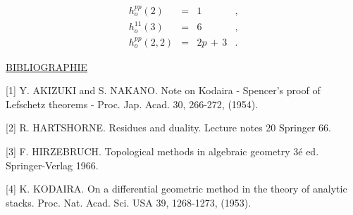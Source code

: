 \begin{equation*}
\begin{array}{rcll}
h_o^{pp}(2) & = & 1 & , \\[2ex]
h_o^{11}(3) & = & 6 & , \\[2ex]
h_o^{pp}(2,2) & = & 2p \, + \, 3 & .
\end{array}
\end{equation*}



\underline{BIBLIOGRAPHIE}

[1] Y. AKIZUKI and S. NAKANO. Note on Kodaira - Spencer's proof of Lefschetz theorems - Proc. Jap. Acad. 30, 266-272, (1954).

[2] R. HARTSHORNE. Residues and duality. Lecture notes 20 Springer 66.

[3] F. HIRZEBRUCH. Topological methods in algebraic geometry 3é ed. Springer-Verlag 1966.

[4] K. KODAIRA. On a differential geometric method in the theory of analytic stacks. Proc. Nat. Acad. Sci. USA 39, 1268-1273, (1953).
